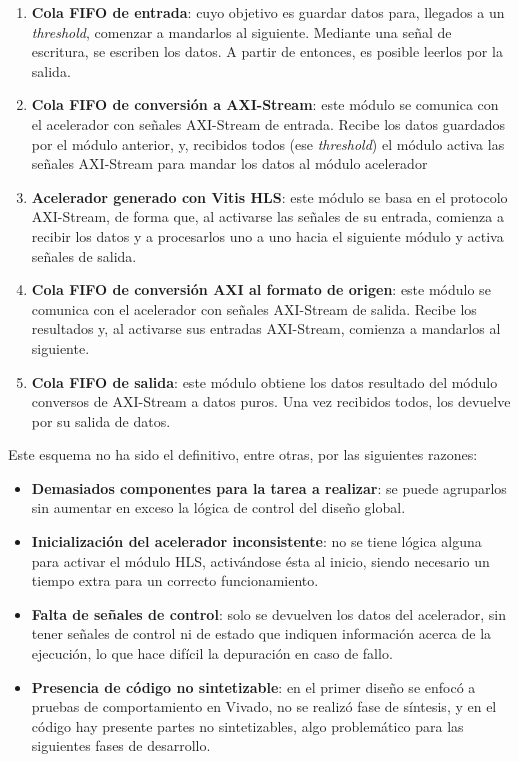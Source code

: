 \begin{enumerate}
    \item \textbf{Cola FIFO de entrada}: cuyo objetivo es guardar datos para, llegados a un \textit{threshold}, comenzar a mandarlos al siguiente. Mediante una señal de escritura, se escriben los datos. A partir de entonces, es posible leerlos por la salida.
    \item \textbf{Cola FIFO de conversión a AXI-Stream}: este módulo se comunica con el acelerador con señales AXI-Stream de entrada. Recibe los datos guardados por el módulo anterior, y, recibidos todos (ese \textit{threshold}) el módulo activa las señales AXI-Stream para mandar los datos al módulo acelerador
    \item \textbf{Acelerador generado con Vitis HLS}: este módulo se basa en el protocolo AXI-Stream, de forma que, al activarse las señales de su entrada, comienza a recibir los datos y a procesarlos uno a uno hacia el siguiente módulo y activa señales de salida.
    \item \textbf{Cola FIFO de conversión AXI al formato de origen}: este módulo se comunica con el acelerador con señales AXI-Stream de salida. Recibe los resultados y, al activarse sus entradas AXI-Stream, comienza a mandarlos al siguiente.
    \item \textbf{Cola FIFO de salida}: este módulo obtiene los datos resultado del módulo conversos de AXI-Stream a datos puros. Una vez recibidos todos, los devuelve por su salida de datos.
\end{enumerate}

Este esquema no ha sido el definitivo, entre otras, por las siguientes razones:

\begin{itemize}
    \item \textbf{Demasiados componentes para la tarea a realizar}: se puede agruparlos sin aumentar en exceso la lógica de control del diseño global.
    \item \textbf{Inicialización del acelerador inconsistente}: no se tiene lógica alguna para activar el módulo HLS, activándose ésta al inicio, siendo necesario un tiempo extra para un correcto funcionamiento.
    \item \textbf{Falta de señales de control}: solo se devuelven los datos del acelerador, sin tener señales de control ni de estado que indiquen información acerca de la ejecución, lo que hace difícil la depuración en caso de fallo.
    \item \textbf{Presencia de código no sintetizable}: en el primer diseño se enfocó a pruebas de comportamiento en Vivado, no se realizó fase de síntesis, y en el código hay presente partes no sintetizables, algo problemático para las siguientes fases de desarrollo.
\end{itemize}

